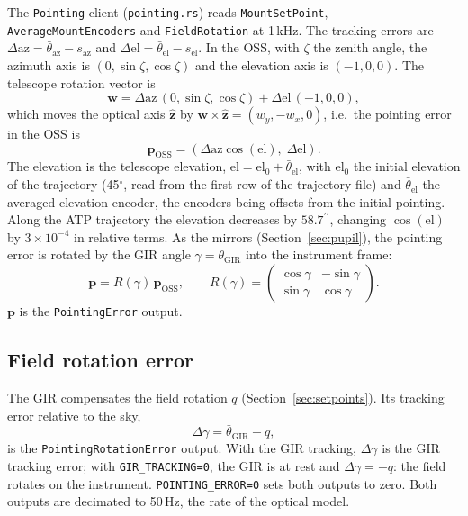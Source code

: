 \documentclass{gmto}
\numberwithin{table}{section}
\numberwithin{equation}{section}
\newcommand{\code}[1]{\texttt{#1}}
\newcommand{\arcsec}{^{\prime\prime}}
\newcommand{\vect}[1]{\boldsymbol{#1}}
\begin{document}
The \code{Pointing} client (\code{pointing.rs}) reads \code{MountSetPoint},
\code{AverageMountEncoders} and \code{FieldRotation} at 1\,kHz.
The tracking errors are $\Delta\mathrm{az} = \bar\theta_{\mathrm{az}} - s_{\mathrm{az}}$ and
$\Delta\mathrm{el} = \bar\theta_{\mathrm{el}} - s_{\mathrm{el}}$.
In the OSS, with $\zeta$ the zenith angle, the azimuth axis is $(0, \sin\zeta, \cos\zeta)$ and the
elevation axis is $(-1, 0, 0)$. The telescope rotation vector is
\begin{equation}
  \vect{w} = \Delta\mathrm{az}\,(0, \sin\zeta, \cos\zeta) + \Delta\mathrm{el}\,(-1, 0, 0),
\end{equation}
which moves the optical axis $\hat{\vect{z}}$ by
$\vect{w}\times\hat{\vect{z}} = (w_y, -w_x, 0)$, i.e.\ the pointing error in the OSS is
\begin{equation}
  \vect{p}_{\mathrm{OSS}} = \left(\Delta\mathrm{az}\cos(\mathrm{el}),\; \Delta\mathrm{el}\right).
  \label{eq:pe}
\end{equation}
The elevation is the telescope elevation, $\mathrm{el} = \mathrm{el}_0 + \bar\theta_{\mathrm{el}}$,
with $\mathrm{el}_0$ the initial elevation of the trajectory (45$^\circ$, read from the first row of
the trajectory file) and $\bar\theta_{\mathrm{el}}$ the averaged elevation encoder, the encoders being
offsets from the initial pointing. Along the ATP trajectory the elevation decreases by $58.7\arcsec$,
changing $\cos(\mathrm{el})$ by $3\times10^{-4}$ in relative terms.
As the mirrors (Section~\ref{sec:pupil}), the pointing error is rotated by the GIR angle
$\gamma = \bar\theta_{\mathrm{GIR}}$ into the instrument frame:
\begin{equation}
  \vect{p} = R(\gamma)\,\vect{p}_{\mathrm{OSS}}, \qquad
  R(\gamma) = \begin{pmatrix}\cos\gamma & -\sin\gamma\\ \sin\gamma & \cos\gamma\end{pmatrix}.
\end{equation}
$\vect{p}$ is the \code{PointingError} output.

\subsection{Field rotation error}
\label{sec:rotation-error}

The GIR compensates the field rotation $q$ (Section~\ref{sec:setpoints}). Its tracking error relative
to the sky,
\begin{equation}
  \Delta\gamma = \bar\theta_{\mathrm{GIR}} - q,
\end{equation}
is the \code{PointingRotationError} output. With the GIR tracking, $\Delta\gamma$ is the GIR tracking
error; with \code{GIR\_TRACKING=0}, the GIR is at rest and $\Delta\gamma = -q$: the field rotates on
the instrument. \code{POINTING\_ERROR=0} sets both outputs to zero.
Both outputs are decimated to 50\,Hz, the rate of the optical model.
\end{document}
